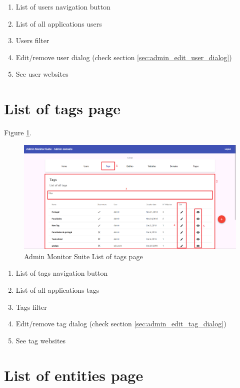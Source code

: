 \begin{enumerate}
    \item List of users navigation button
    \item List of all applications users
    \item Users filter
    \item Edit/remove user dialog (check section \ref{sec:admin_edit_user_dialog})
    \item See user websites
\end{enumerate}

\section{List of tags page}

Figure \ref{fig:admin_list_tags_page}.

\begin{figure}[H]
    \centering
    \includegraphics[width=\linewidth]{lib/images/admin/admin_list_tags_page.png}
    \caption{Admin Monitor Suite List of tags page}
    \label{fig:admin_list_tags_page}
\end{figure}

\begin{enumerate}
    \item List of tags navigation button
    \item List of all applications tags
    \item Tags filter
    \item Edit/remove tag dialog (check section \ref{sec:admin_edit_tag_dialog})
    \item See tag websites
\end{enumerate}

\clearpage

\section{List of entities page}

